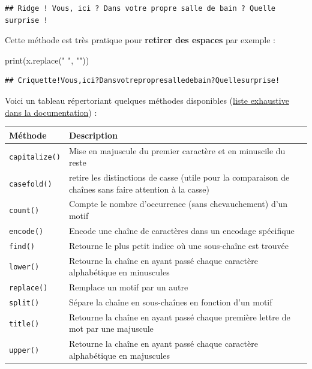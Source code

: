 \documentclass[
  12pt,
]{book}
\newenvironment{Shaded}{\begin{snugshade}}{\end{snugshade}}
\newcommand{\BuiltInTok}[1]{#1}
\newcommand{\NormalTok}[1]{#1}
\newcommand{\StringTok}[1]{\textcolor[rgb]{0.31,0.60,0.02}{#1}}
\numberwithin{equation}{section}
\numberwithin{countremarque}{section}
\begin{document}
\begin{lstlisting}
## Ridge ! Vous, ici ? Dans votre propre salle de bain ? Quelle surprise !
\end{lstlisting}

Cette méthode est très pratique pour \textbf{retirer des espaces} par exemple :

\begin{Shaded}
\begin{Highlighting}[]
\BuiltInTok{print}\NormalTok{(x.replace(}\StringTok{" "}\NormalTok{, }\StringTok{""}\NormalTok{))}
\end{Highlighting}
\end{Shaded}

\begin{lstlisting}
## Criquette!Vous,ici?Dansvotrepropresalledebain?Quellesurprise!
\end{lstlisting}

Voici un tableau répertoriant quelques méthodes disponibles (\href{https://docs.python.org/3/library/stdtypes.html\#string-methods}{liste exhaustive dans la documentation}) :

\begin{longtable}[]{@{}
  >{\raggedleft\arraybackslash}p{}
  >{\raggedleft\arraybackslash}p{}@{}}
\toprule\noalign{}
\begin{minipage}[b]{\linewidth}\raggedleft
Méthode
\end{minipage} & \begin{minipage}[b]{\linewidth}\raggedleft
Description
\end{minipage} \\
\midrule\noalign{}
\endhead
\bottomrule\noalign{}
\endlastfoot
\texttt{capitalize()} & Mise en majuscule du premier caractère et en minuscile du reste \\
\texttt{casefold()} & retire les distinctions de casse (utile pour la comparaison de chaînes sans faire attention à la casse) \\
\texttt{count()} & Compte le nombre d'occurrence (sans chevauchement) d'un motif \\
\texttt{encode()} & Encode une chaîne de caractères dans un encodage spécifique \\
\texttt{find()} & Retourne le plus petit indice où une sous-chaîne est trouvée \\
\texttt{lower()} & Retourne la chaîne en ayant passé chaque caractère alphabétique en minuscules \\
\texttt{replace()} & Remplace un motif par un autre \\
\texttt{split()} & Sépare la chaîne en sous-chaînes en fonction d'un motif \\
\texttt{title()} & Retourne la chaîne en ayant passé chaque première lettre de mot par une majuscule \\
\texttt{upper()} & Retourne la chaîne en ayant passé chaque caractère alphabétique en majuscules \\
\end{longtable}
\end{document}

